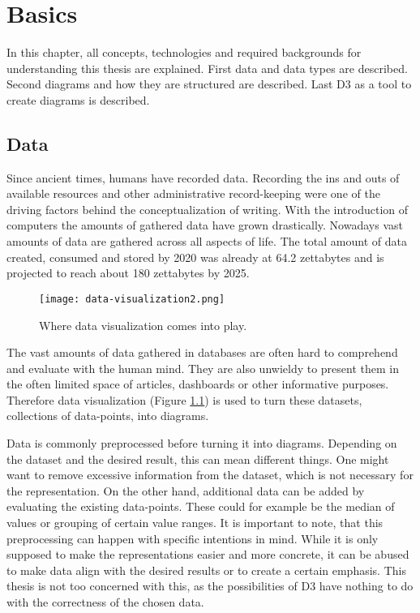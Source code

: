 \chapter{Basics}

In this chapter, all concepts, technologies and required backgrounds for understanding this thesis are explained. First data and data types are described. Second diagrams and how they are structured are described. Last D3 as a tool to create diagrams is described.


\section{Data}

Since ancient times, humans have recorded data. Recording the ins and outs of available resources and other administrative record-keeping were one of the driving factors behind the conceptualization of writing\cite{senner1991origins}.
With the introduction of computers the amounts of gathered data have grown drastically. Nowadays vast amounts of data are gathered across all aspects of life. The total amount of data created, consumed and stored by 2020 was already at 64.2 zettabytes and is projected to reach about 180 zettabytes by 2025\cite{statista_2022}.

\begin{figure}
    \texttt{[image: data-visualization2.png]}
    \caption[data-visualization]{Where data visualization comes into play.}
    \label{fig:data-visualization}
\end{figure}

The vast amounts of data gathered in databases are often hard to comprehend and evaluate with the human mind. They are also unwieldy to present them in the often limited space of articles, dashboards or other informative purposes. Therefore data visualization (Figure \ref{fig:data-visualization}) is used to turn these datasets, collections of data-points, into diagrams.

Data is commonly preprocessed before turning it into diagrams. Depending on the dataset and the desired result, this can mean different things. One might want to remove excessive information from the dataset, which is not necessary for the representation. On the other hand, additional data can be added by evaluating the existing data-points. These could for example be the median of values or grouping of certain value ranges\cite{garcia2015data}. It is important to note, that this preprocessing can happen with specific intentions in mind. While it is only supposed to make the representations easier and more concrete, it can be abused to make data align with the desired results or to create a certain emphasis. This thesis is not too concerned with this, as the possibilities of D3 have nothing to do with the correctness of the chosen data.

